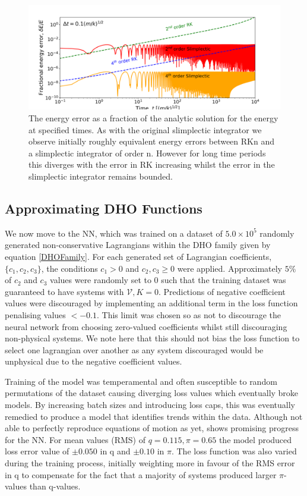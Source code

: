 \documentclass[10pt]{iopart}
\begin{document}
\begin{figure}
	\includegraphics[width=\columnwidth]{EnergyPlot.png}
	\caption{The energy error as a fraction of the analytic solution for the energy at specified times. As with the original slimplectic integrator we observe initially roughly equivalent energy errors between RKn and a slimplectic integrator of order n. However for long time periods this diverges with the error in RK increasing whilst the error in the slimplectic integrator remains bounded.}
		\label{EnergyPlot}
\end{figure}

\subsection{Approximating DHO Functions}
\label{NN Results}
We now move to the NN, which was trained on a dataset of $5.0\times10^5$ randomly generated non-conservative Lagrangians within the DHO family given by equation \ref{DHOFamily}. For each generated set of Lagrangian coefficients, $\{c_1,c_2,c_3\}$, the conditions $c_1 > 0$ and $c_2,c_3 \geq 0$ were applied. Approximately $5\%$ of $c_2$ and $c_3$ values were randomly set to 0 such that the training dataset was guaranteed to have systems with $\mathcal V,K = 0$. 
Predictions of negative coefficient values were discouraged by implementing an additional term in the loss function penalising values $ < -0.1$. This limit was chosen so as not to discourage the neural network from choosing zero-valued coefficients whilst still discouraging non-physical systems. We note here that this should not bias the loss function to select one lagrangian over another as any system discouraged would be unphysical due to the negative coefficient values. 

Training of the model was temperamental and often susceptible to random permutations of the dataset causing diverging loss values which eventually broke models. By increasing batch sizes and introducing loss caps, this was eventually remedied to produce a model that identifies trends within the data. Although not able to perfectly reproduce equations of motion as yet,  shows promising progress for the NN. For mean values (RMS) of $q=0.115, \pi = 0.65$ the model produced loss error value of $\pm0.050$ in q and $\pm0.10$ in $\pi$. The loss function was also varied during the training process, initially weighting more in favour of the RMS error in q to compensate for the fact that a majority of systems produced larger $\pi$-values than q-values. 
\end{document}
